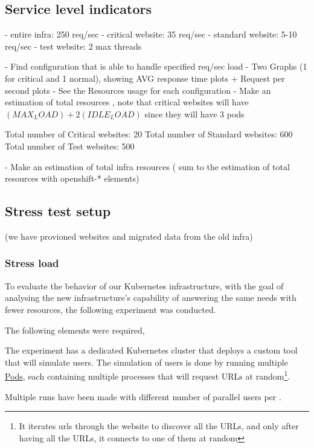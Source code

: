 \subsection{Service level indicators}

- entire infra: 250 req/sec
- critical website: 35 req/sec
- standard website: 5-10 req/sec %
- test website: 2 max threads

- Find configuration that is able to handle specified req/sec load
- Two Graphs (1 for critical and 1 normal), showing AVG response time plots + Request per second plots
- See the Resources usage for each configuration
- Make an estimation of total resources , note that critical websites will have $(MAX_LOAD) + 2(IDLE_LOAD)$ since they will have 3 pods

Total number of Critical websites: 20
Total number of Standard websites: 600
Total number of Test websites: 500


- Make an estimation of total infra resources ( sum to the estimation of total resources with openshift-* elements)


\subsection{Stress test setup}


 (we have provioned websites and migrated data from the old infra)
\subsubsection*{Stress load}

To evaluate the behavior of our Kubernetes infrastructure, with the goal of analysing the new infrastructure's capability of answering the same needs with fewer resources, the following experiment was conducted.

The following elements were required, 

The experiment has a dedicated Kubernetes cluster that deploys a custom tool that will simulate users. 
The simulation of users is done by running multiple \hyperlink{https://kubernetes.io/docs/concepts/workloads/pods/}{Pods}, each containing multiple processes that will request URLs at random\footnote{It iterates urls through the website to discover all the URLs, and only after having all the URLs, it connects to one of them at random}.

Multiple runs have been made with different number of parallel users per .

